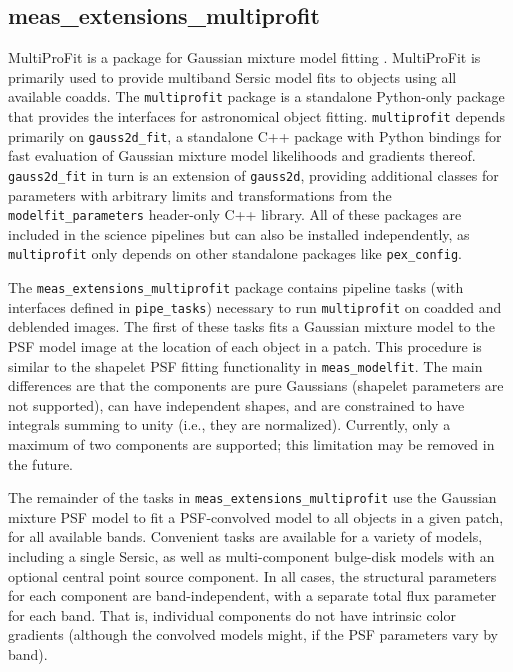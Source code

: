 \subsection{meas\_extensions\_multiprofit}
\label{sec:meas_extensions_multiprofit}

MultiProFit is a package for Gaussian mixture model fitting \citep{DMTN-312}.
MultiProFit is primarily used to provide multiband Sersic model fits to objects using all available coadds.
The \texttt{multiprofit} package is a standalone Python-only package that provides the interfaces for astronomical object fitting.
\texttt{multiprofit} depends primarily on \texttt{gauss2d\_fit}, a standalone C++ package with Python bindings for fast evaluation of Gaussian mixture model likelihoods and gradients thereof.
\texttt{gauss2d\_fit} in turn is an extension of \texttt{gauss2d}, providing additional classes for parameters with arbitrary limits and transformations from the \texttt{modelfit\_parameters} header-only C++ library.
All of these packages are included in the science pipelines but can also be installed independently, as \texttt{multiprofit} only depends on other standalone packages like \texttt{pex\_config}.

The \texttt{meas\_extensions\_multiprofit} package contains pipeline tasks (with interfaces defined in \texttt{pipe\_tasks}) necessary to run \texttt{multiprofit} on coadded and deblended images.
The first of these tasks fits a Gaussian mixture model to the PSF model image at the location of each object in a patch.
This procedure is similar to the shapelet PSF fitting functionality in \texttt{meas\_modelfit}.
The main differences are that the components are pure Gaussians (shapelet parameters are not supported), can have independent shapes, and are constrained to have integrals summing to unity (i.e., they are normalized).
Currently, only a maximum of two components are supported; this limitation may be removed in the future.

The remainder of the tasks in \texttt{meas\_extensions\_multiprofit} use the Gaussian mixture PSF model to fit a PSF-convolved model to all objects in a given patch, for all available bands.
Convenient tasks are available for a variety of models, including a single Sersic, as well as multi-component bulge-disk models with an optional central point source component.
In all cases, the structural parameters for each component are band-independent, with a separate total flux parameter for each band.
That is, individual components do not have intrinsic color gradients (although the convolved models might, if the PSF parameters vary by band).
